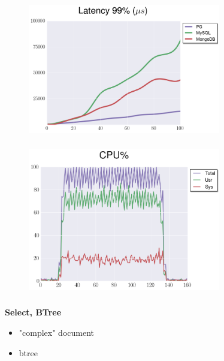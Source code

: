 \documentclass[usenames,dvipsnames, 18pt, compress, aspectratio=169]{beamer}
\begin{document}
\begin{frame}
    \frametitle{}
    \begin{center}
    \begin{figure}
        \includegraphics[width=0.75\textwidth,center]{benchmarks/select_btree_latency.png}
    \end{figure}
    \end{center}
\end{frame}

\begin{frame}
    \frametitle{}
    \begin{center}
    \begin{figure}
        \includegraphics[width=0.75\textwidth,center]{benchmarks/pg_select_cpu_20.png}
    \end{figure}
    \end{center}
\end{frame}

\begin{frame}
    \frametitle{}
    \begin{center}
        \textbf{Select, BTree}
        \begin{itemize}[label={}]
            \item "complex" document
            \item btree
        \end{itemize}
    \end{center}
\end{frame}
\end{document}
